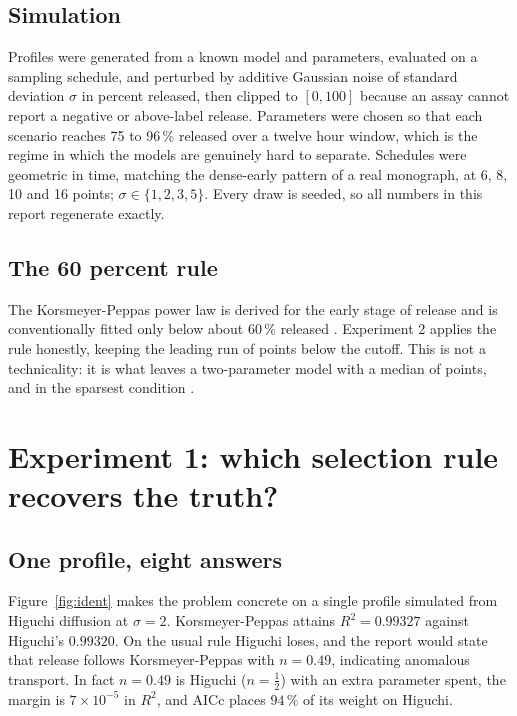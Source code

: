 \documentclass[11pt,a4paper]{article}
\begin{document}
\subsection{Simulation}

Profiles were generated from a known model and parameters, evaluated on a
sampling schedule, and perturbed by additive Gaussian noise of standard
deviation $\sigma$ in percent released, then clipped to $[0,100]$ because an
assay cannot report a negative or above-label release. Parameters were chosen
so that each scenario reaches 75 to 96\,\% released over a twelve hour window,
which is the regime in which the models are genuinely hard to separate.
Schedules were geometric in time, matching the dense-early pattern of a real
monograph, at 6, 8, 10 and 16 points; $\sigma \in \{1,2,3,5\}$. Every draw is
seeded, so all numbers in this report regenerate exactly.

\subsection{The 60 percent rule}

The Korsmeyer-Peppas power law is derived for the early stage of release and
is conventionally fitted only below about 60\,\% released
\cite{ritger1987a,peppas1985}. Experiment 2
applies the rule honestly, keeping the leading run of points below the cutoff.
This is not a technicality: it is what leaves a two-parameter model with a
median of \mechKept{} points, and in the sparsest condition \mechKeptMin{}.

\section{Experiment 1: which selection rule recovers the truth?}

\subsection{One profile, eight answers}

Figure~\ref{fig:ident} makes the problem concrete on a single profile
simulated from Higuchi diffusion at $\sigma=2$. Korsmeyer-Peppas attains
$R^2=0.99327$ against Higuchi's $0.99320$. On the usual rule Higuchi loses,
and the report would state that release follows Korsmeyer-Peppas with
$n=0.49$, indicating anomalous transport. In fact $n=0.49$ is Higuchi
($n=\tfrac{1}{2}$) with an extra parameter spent, the margin is $7\times
10^{-5}$ in $R^2$, and AICc places $94\,\%$ of its weight on Higuchi.
\end{document}
